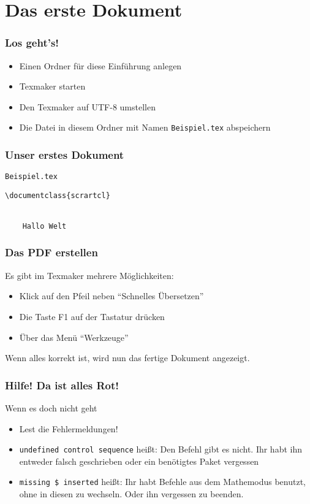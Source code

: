 \section{Das erste Dokument}

\begin{frame}
    \frametitle{Los geht's!}
    \begin{itemize}
        \item Einen Ordner für diese Einführung anlegen
        \item Texmaker starten
        \item Den Texmaker auf UTF-8 umstellen
        \item Die Datei in diesem Ordner mit Namen \texttt{Beispiel.tex} abspeichern
    \end{itemize}
\end{frame}


\begin{frame}[fragile]
    \frametitle{Unser erstes Dokument}
    \begin{block}{\texttt{Beispiel.tex}}
    \begin{verbatim}
\documentclass{scrartcl}


    Hallo Welt

\end{verbatim}
    \end{block}
\end{frame}


\begin{frame}
    \frametitle{Das PDF erstellen}
    Es gibt im Texmaker mehrere Möglichkeiten:
    \begin{itemize}
        \item Klick auf den Pfeil neben \enquote{Schnelles Übersetzen}
        \item Die Taste F1 auf der Tastatur drücken
        \item Über das Menü \enquote{Werkzeuge}
    \end{itemize}
    Wenn alles korrekt ist, wird nun das fertige Dokument angezeigt.
\end{frame}


\begin{frame}
    \frametitle{Hilfe! Da ist alles Rot!}
    \begin{alertblock}{Wenn es doch nicht geht}
	    \begin{itemize}
	        \item Lest die Fehlermeldungen!
	        \item \texttt{undefined control sequence} heißt: Den Befehl gibt es nicht. Ihr habt ihn entweder falsch geschrieben oder ein benötigtes Paket vergessen
	        \item \texttt{missing \$ inserted} heißt: Ihr habt Befehle aus dem Mathemodus benutzt, ohne in diesen zu wechseln. Oder ihn vergessen zu beenden.
	    \end{itemize}
    \end{alertblock}
\end{frame}


